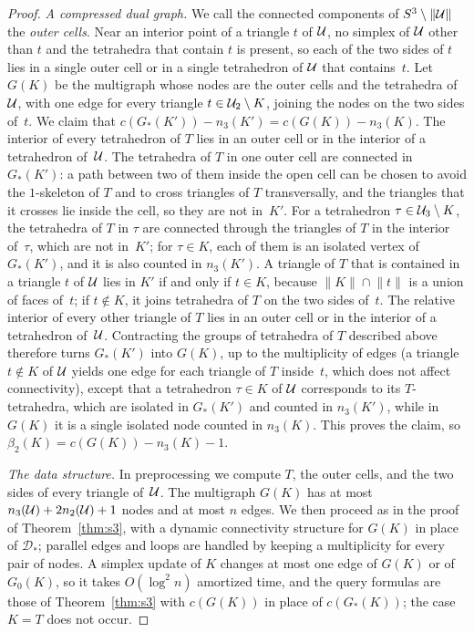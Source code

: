 \begin{proof}
\emph{A compressed dual graph.}
We call the connected components of $S^3\setminus\lVert\mathcal{U}\rVert$ the \emph{outer cells}.
Near an interior point of a triangle $t$ of $\mathcal{U}$, no simplex of $\mathcal{U}$ other than $t$ and the tetrahedra that contain $t$ is present, so each of the two sides of $t$ lies in a single outer cell or in a single tetrahedron of $\mathcal{U}$ that contains~$t$.
Let $G(K)$ be the multigraph whose nodes are the outer cells and the tetrahedra of $\mathcal{U}$, with one edge for every triangle $t\in\mathcal{U}_2\setminus K$, joining the nodes on the two sides of~$t$.
We claim that $c(G_\ast(K'))-n_3(K')=c(G(K))-n_3(K)$.
The interior of every tetrahedron of $T$ lies in an outer cell or in the interior of a tetrahedron of~$\mathcal{U}$.
The tetrahedra of $T$ in one outer cell are connected in $G_\ast(K')$: a path between two of them inside the open cell can be chosen to avoid the $1$-skeleton of $T$ and to cross triangles of $T$ transversally, and the triangles that it crosses lie inside the cell, so they are not in~$K'$.
For a tetrahedron $\tau\in\mathcal{U}_3\setminus K$, the tetrahedra of $T$ in $\tau$ are connected through the triangles of $T$ in the interior of~$\tau$, which are not in~$K'$; for $\tau\in K$, each of them is an isolated vertex of $G_\ast(K')$, and it is also counted in $n_3(K')$.
A triangle of $T$ that is contained in a triangle $t$ of $\mathcal{U}$ lies in $K'$ if and only if $t\in K$, because $\lVert K\rVert\cap\lVert t\rVert$ is a union of faces of~$t$; if $t\notin K$, it joins tetrahedra of $T$ on the two sides of~$t$.
The relative interior of every other triangle of $T$ lies in an outer cell or in the interior of a tetrahedron of~$\mathcal{U}$.
Contracting the groups of tetrahedra of $T$ described above therefore turns $G_\ast(K')$ into $G(K)$, up to the multiplicity of edges (a triangle $t\notin K$ of $\mathcal{U}$ yields one edge for each triangle of $T$ inside~$t$, which does not affect connectivity), except that a tetrahedron $\tau\in K$ of $\mathcal{U}$ corresponds to its $T$-tetrahedra, which are isolated in $G_\ast(K')$ and counted in $n_3(K')$, while in $G(K)$ it is a single isolated node counted in $n_3(K)$.
This proves the claim, so $\beta_2(K)=c(G(K))-n_3(K)-1$.

\emph{The data structure.}
In preprocessing we compute $T$, the outer cells, and the two sides of every triangle of~$\mathcal{U}$.
The multigraph $G(K)$ has at most $n_3(\mathcal{U})+2n_2(\mathcal{U})+1$ nodes and at most $n$ edges.
We then proceed as in the proof of Theorem~\ref{thm:s3}, with a dynamic connectivity structure for $G(K)$ in place of $\mathcal{D}_\ast$; parallel edges and loops are handled by keeping a multiplicity for every pair of nodes.
A simplex update of $K$ changes at most one edge of $G(K)$ or of $G_0(K)$, so it takes $O(\log^2n)$ amortized time, and the query formulas are those of Theorem~\ref{thm:s3} with $c(G(K))$ in place of $c(G_\ast(K))$; the case $K=T$ does not occur.
\end{proof}

